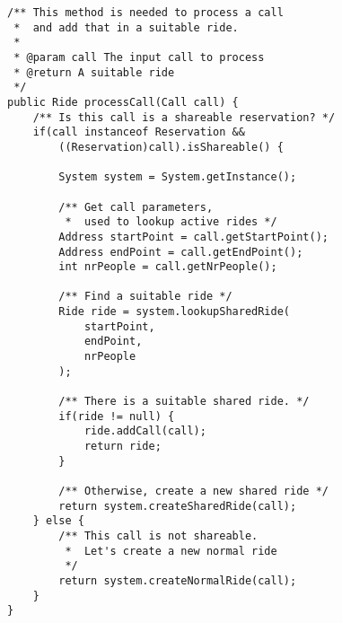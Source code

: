 \begin{lstlisting}[frame=single]
/** This method is needed to process a call 
 *  and add that in a suitable ride.
 *
 * @param call The input call to process 
 * @return A suitable ride
 */
public Ride processCall(Call call) {
    /** Is this call is a shareable reservation? */
    if(call instanceof Reservation && 
        ((Reservation)call).isShareable() {

        System system = System.getInstance();

        /** Get call parameters, 
         *  used to lookup active rides */
        Address startPoint = call.getStartPoint();
        Address endPoint = call.getEndPoint();
        int nrPeople = call.getNrPeople();

        /** Find a suitable ride */
        Ride ride = system.lookupSharedRide(
            startPoint, 
            endPoint, 
            nrPeople
        );

        /** There is a suitable shared ride. */
        if(ride != null) {
            ride.addCall(call);
            return ride;
        }
        
        /** Otherwise, create a new shared ride */
        return system.createSharedRide(call);
    } else {
        /** This call is not shareable. 
         *  Let's create a new normal ride
         */
        return system.createNormalRide(call); 
    }
}
\end{lstlisting}
